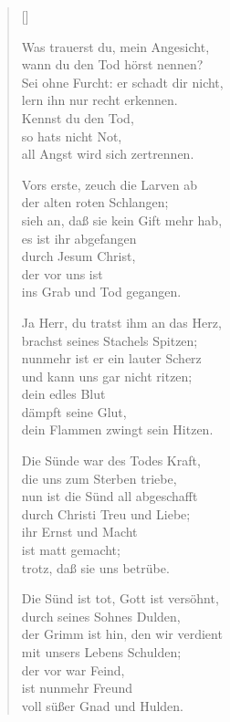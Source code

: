 \begin{multicols}{2}
\settowidth{\versewidth}{Ja Herr, du tratst ihm an das Herz,}
\begin{verse}[\versewidth]

 Was trauerst du, mein Angesicht,\\
wann du den Tod hörst nennen?\\
Sei ohne Furcht: er schadt dir nicht,\\
lern ihn nur recht erkennen.\\
Kennst du den Tod,\\
so hats nicht Not,\\
all Angst wird sich zertrennen.

 Vors erste, zeuch die Larven ab\\
der alten roten Schlangen;\\
sieh an, daß sie kein Gift mehr hab,\\
es ist ihr abgefangen\\
durch Jesum Christ,\\
der vor uns ist\\
ins Grab und Tod gegangen.

 Ja Herr, du tratst ihm an das Herz,\\
brachst seines Stachels Spitzen;\\
nunmehr ist er ein lauter Scherz\\
und kann uns gar nicht ritzen;\\
dein edles Blut\\
dämpft seine Glut,\\
dein Flammen zwingt sein Hitzen.

 Die Sünde war des Todes Kraft,\\
die uns zum Sterben triebe,\\
nun ist die Sünd all abgeschafft\\
durch Christi Treu und Liebe;\\
ihr Ernst und Macht\\
ist matt gemacht;\\
trotz, daß sie uns betrübe.

 Die Sünd ist tot, Gott ist versöhnt,\\
durch seines Sohnes Dulden,\\
der Grimm ist hin, den wir verdient\\
mit unsers Lebens Schulden;\\
der vor war Feind,\\
ist nunmehr Freund\\
voll süßer Gnad und Hulden.


\end{verse}
\end{multicols}
